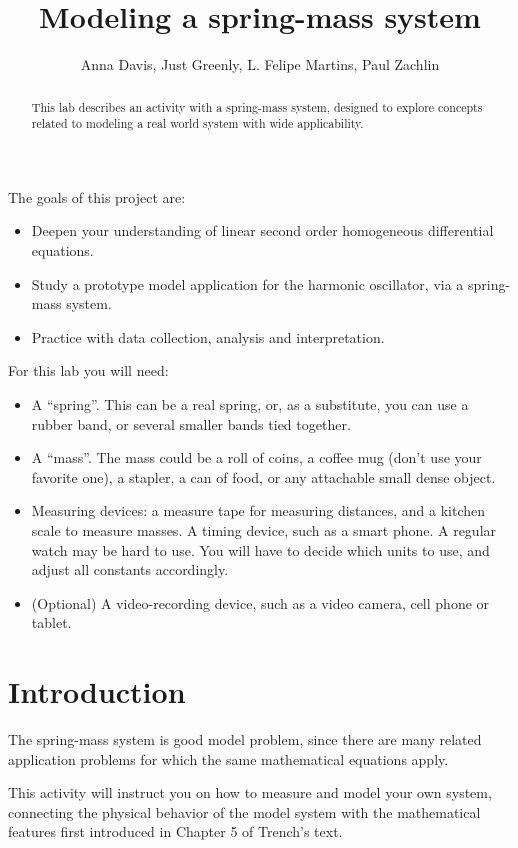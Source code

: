 \documentclass{ximera}
\title{Modeling a spring-mass system}
\author{Anna Davis, Just Greenly, L. Felipe Martins, Paul Zachlin}
\begin{document}
\begin{abstract}
This lab describes an activity with a spring-mass system, designed to explore concepts related to modeling a real world system with wide applicability.
\end{abstract}

\maketitle

The goals of this project are:
\begin{itemize}
    \item Deepen your understanding of linear second order homogeneous differential equations.
    \item Study a prototype model application for the harmonic oscillator, via a spring-mass system.
    \item Practice with data collection, analysis and interpretation.
\end{itemize}

For this lab you will need:
\begin{itemize}
    \item A ``spring''. This can be a real spring, or, as a substitute, you can use a rubber band, or several smaller bands tied together.
    \item A ``mass''. The mass could be a roll of coins, a coffee mug (don’t use your favorite one), a stapler, a can of food, or any attachable small dense object.
    \item Measuring devices: a measure tape for measuring distances, and a kitchen scale to measure masses. A timing device, such as a smart phone. A regular watch may be hard to use. You will have to decide which units to use, and adjust all constants accordingly.
    \item (Optional) A video-recording device, such as a video camera, cell phone or tablet.
\end{itemize}

\section{Introduction}

The spring-mass system is good model problem, since there are many related application problems for which the same mathematical equations apply.  

This activity will instruct you on how to measure and model your own system, connecting the physical behavior of the model system with the mathematical features first introduced in Chapter 5 of Trench’s text.
\end{document}
